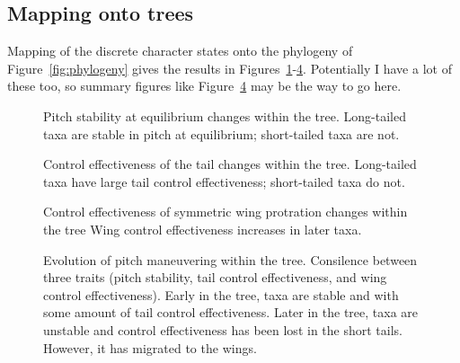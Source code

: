 \subsection{Mapping onto trees}
Mapping of the discrete character states onto the phylogeny of Figure~\ref{fig:phylogeny} gives the results in Figures~\ref{fig:pitchstabeq}-\ref{fig:pitchall}. Potentially I have a lot of these too, so summary figures like Figure~\ref{fig:pitchall} may be the way to go here.  
\begin{figure}[!ht]
\begin{center}
\end{center}
\caption{%
{ Pitch stability at equilibrium changes within the tree.}  Long-tailed taxa are stable in pitch at equilibrium; short-tailed taxa are not.
}
\label{fig:pitchstabeq}
\end{figure}
\begin{figure}[!ht]
\begin{center}
\end{center}
\caption{%
{ Control effectiveness of the tail changes within the tree.}  Long-tailed taxa have large tail control effectiveness; short-tailed taxa do not.
}
\label{fig:pitchtaileq}
\end{figure}
\begin{figure}[!ht]
\begin{center}
\end{center}
\caption{%
{ Control effectiveness of symmetric wing protration changes within the tree} Wing control effectiveness increases in later taxa.
}
\label{fig:pitchwing15}
\end{figure}
\begin{figure}[!ht]
\begin{center}
\end{center}
\caption{%
{ Evolution of pitch maneuvering within the tree.}  Consilence between three traits (pitch stability, tail control effectiveness, and wing control effectiveness). Early in the tree, taxa are stable and with some amount of tail control effectiveness.  Later in the tree, taxa are unstable and control effectiveness has been lost in the short tails.  However, it has migrated to the wings.
}
\label{fig:pitchall}
\end{figure}

